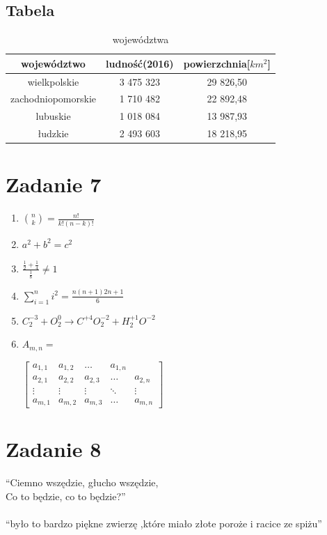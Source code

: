 \documentclass{article}
\begin{document}
\subsection{Tabela}
\begin{table}[h!]
\caption{województwa}
\centering
\label{tab:wojewodztwa}
\begin{tabular}{|c|c|c|}
	\hline 
	\textbf{województwo} & \textbf{ludność}(2016) & \textbf{powierzchnia}[$ km^2 $]\\
	\hline
	wielkpolskie & 3 475 323 & 29 826,50 \\
	\hline
	zachodniopomorskie & 1 710 482 & 22 892,48 \\
	\hline
	lubuskie & 1 018 084 & 13 987,93 \\
	\hline
	łudzkie & 2 493 603 & 18 218,95 \\
	\hline
\end{tabular}
\end{table}
\newpage

\section{Zadanie 7}
\begin{enumerate}[label=(\alph*)]
	\item {\LARGE $ {n\choose k} = \frac{n!}{k!(n-k)!} $}
	\item {\Large $ a^2 + b^2 = c^2 $}
	\item {\LARGE $ \frac{\frac{1}{2}+\frac{1}{4}}{\frac{1}{8}}\neq1 $}
	\item {\LARGE $ \sum_{i=1}^{n}i^2 = \frac{n(n+1)2n+1}{6} $}
	\item {\LARGE $ C_2^{-3} + O_2^0 \rightarrow C^{+4}O_2^{-2} + H_2^{+1}O^{-2} $} 
	\item $ A_{m,n}   = $
	
	$\begin{bmatrix}
		a_{1,1} & a_{1,2} & \dots & a_{1,n} \\
		a_{2,1} & a_{2,2} & a_{2,3} & \dots  & a_{2,n} \\
		\vdots & \vdots & \vdots & \ddots & \vdots \\
		a_{m,1} & a_{m,2} & a_{m,3} & \dots  & a_{m,n}
	\end{bmatrix}$
	
	
\end{enumerate}
\newpage

\section{Zadanie 8}
\noindent
\enquote{Ciemno wszędzie, głucho wszędzie,\\ Co to będzie, co to będzie?}\cite{mickiewicz1992dziady}\\\\
\enquote{było to bardzo piękne zwierzę ,które miało złote poroże i racice ze spiżu}\cite{parandowski1989mitologia}\\



\end{document}
